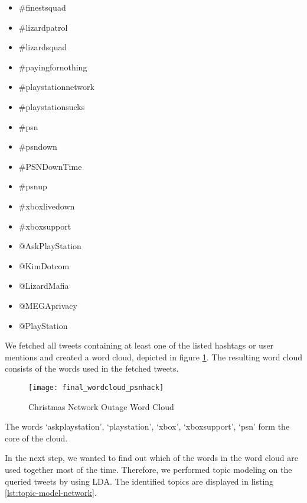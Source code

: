 \begin{multicols}{3}
\begin{itemize}[label={}]
	\item \#finestsquad
	\item \#lizardpatrol
    \item \#lizardsquad
    \item \#payingfornothing
    \item \#playstationnetwork
    \item \#playstationsucks
    \item \#psn
    \item \#psndown
    \item \#PSNDownTime
    \item \#psnup
    \item \#xboxlivedown
    \item \#xboxsupport
    \item @AskPlayStation
    \item @KimDotcom
    \item @LizardMafia
    \item @MEGAprivacy
    \item @PlayStation
\end{itemize}
  \fixspacing
\end{multicols}

We fetched all tweets containing at least one of the listed hashtags or user mentions and created a word cloud, depicted in figure \ref{fig:christmas-network-outage-word-cloud}. The resulting word cloud consists of the words used in the fetched tweets.

\begin{figure}[H]
  \centering
        \texttt{[image: final\_wordcloud\_psnhack]}
  \caption[Christmas Network Outage Word Cloud]{Christmas Network Outage Word Cloud}
  \label{fig:christmas-network-outage-word-cloud}
  \vspace{-1.3em}
\end{figure}

The words ‘askplaystation’, ‘playstation’, ‘xbox’, ‘xboxsupport’, ‘psn’ form the core of the cloud.

In the next step, we wanted to find out which of the words in the word cloud are used together most of the time. Therefore, we performed topic modeling on the queried tweets by using LDA.
The identified topics are displayed in listing \ref{lst:topic-model-network}.

